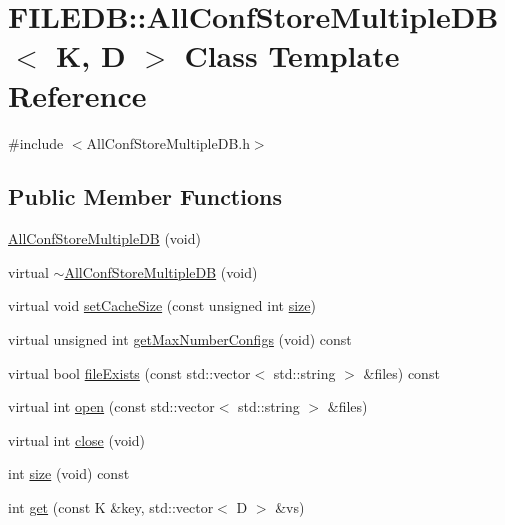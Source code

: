 \hypertarget{classFILEDB_1_1AllConfStoreMultipleDB}{}\section{F\+I\+L\+E\+DB\+:\+:All\+Conf\+Store\+Multiple\+DB$<$ K, D $>$ Class Template Reference}
\label{classFILEDB_1_1AllConfStoreMultipleDB}


{\ttfamily \#include $<$All\+Conf\+Store\+Multiple\+D\+B.\+h$>$}

\subsection*{Public Member Functions}
\begin{DoxyCompactItemize}
\item 
\mbox{\hyperlink{classFILEDB_1_1AllConfStoreMultipleDB_a0c45fce64168ca576e875747eb599927}{All\+Conf\+Store\+Multiple\+DB}} (void)
\item 
virtual \mbox{\hyperlink{classFILEDB_1_1AllConfStoreMultipleDB_a88489be8d488c6fe3a88312f200e7fdd}{$\sim$\+All\+Conf\+Store\+Multiple\+DB}} (void)
\item 
virtual void \mbox{\hyperlink{classFILEDB_1_1AllConfStoreMultipleDB_a746ef51b2dedf529a8e85528c0d31bfc}{set\+Cache\+Size}} (const unsigned int \mbox{\hyperlink{classFILEDB_1_1AllConfStoreMultipleDB_af05105b1ffe17093556a209ac9db1ed9}{size}})
\item 
virtual unsigned int \mbox{\hyperlink{classFILEDB_1_1AllConfStoreMultipleDB_a9348ec8716b4c716df67dca608bb1bde}{get\+Max\+Number\+Configs}} (void) const
\item 
virtual bool \mbox{\hyperlink{classFILEDB_1_1AllConfStoreMultipleDB_aa5a7c38b3785226da6f30a4ab5e51428}{file\+Exists}} (const std\+::vector$<$ std\+::string $>$ \&files) const
\item 
virtual int \mbox{\hyperlink{classFILEDB_1_1AllConfStoreMultipleDB_aa006283e8d6f0f079ca234c369f53679}{open}} (const std\+::vector$<$ std\+::string $>$ \&files)
\item 
virtual int \mbox{\hyperlink{classFILEDB_1_1AllConfStoreMultipleDB_a71aed1deeb31450afee4b692941dbae1}{close}} (void)
\item 
int \mbox{\hyperlink{classFILEDB_1_1AllConfStoreMultipleDB_af05105b1ffe17093556a209ac9db1ed9}{size}} (void) const
\item 
int \mbox{\hyperlink{classFILEDB_1_1AllConfStoreMultipleDB_a3a9858458bf0ecc76133e1c448568cf5}{get}} (const K \&key, std\+::vector$<$ D $>$ \&vs)

\end{DoxyCompactItemize}
